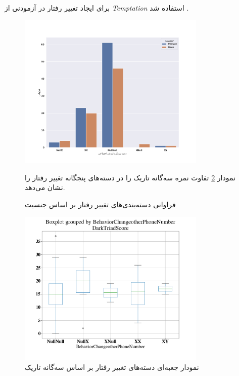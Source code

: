 برای ایجاد تغییر رفتار در آزمودنی از 
\!\textit{
    \gls{Temptation}
}
استفاده شد
\citep{maihaniemiCompetitionLawBig2020}.
\begin{figure}[htpb]
    \centering
    \includegraphics[width=0.8\textwidth]{./img/FrequencyBehaviorPhoneNumber.png}
    \caption{فراوانی دسته‌بندی‌های تغییر رفتار بر اساس جنسیت}
    \label{fig:FrequencyBehaviorPhoneNumber}



نمودار 
\ref{fig:BehavioralChange_DarkTriad_Boxplot}
تفاوت نمره سه‌گانه تاریک را در دسته‌های پنجگانه تغییر رفتار  را نشان می‌دهد.

\end{figure}
\begin{figure}[htpb]
    \centering
    \includegraphics[width=0.8\textwidth]{./img/BehavioralChange_DarkTriad_Boxplot.png}
    \caption{نمودار جعبه‌ای دسته‌های تغییر رفتار بر اساس سه‌گانه تاریک}
    \label{fig:BehavioralChange_DarkTriad_Boxplot}
\end{figure}


